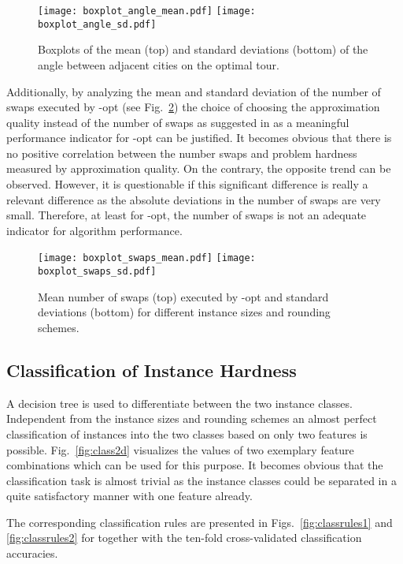 \documentclass{article}
\begin{document}
\begin{figure}
  \centering
  \texttt{[image: boxplot\_angle\_mean.pdf]}
  \texttt{[image: boxplot\_angle\_sd.pdf]}
  \caption{Boxplots of the mean (top) and standard deviations (bottom)
    of the angle between adjacent cities on the optimal tour.}
  \label{fig:anglestour}
\end{figure}

Additionally, by analyzing the mean and standard deviation of the
number of swaps executed by -opt (see Fig.~\ref{fig:swaps}) the
choice of choosing the approximation quality instead of the number of
swaps as suggested in \cite{SMHL10} as a meaningful performance
indicator for -opt can be justified. It becomes obvious that there
is no positive correlation between the number swaps and problem
hardness measured by approximation quality. On the contrary, the
opposite trend can be observed. However, it is questionable if this
significant difference is really a relevant difference as the absolute
deviations in the number of swaps are very small. Therefore, at least
for -opt, the number of swaps is not an adequate indicator for
algorithm performance.

\begin{figure}
  \centering
  \texttt{[image: boxplot\_swaps\_mean.pdf]}
  \texttt{[image: boxplot\_swaps\_sd.pdf]}
  \caption{Mean number of swaps (top) executed by -opt and standard
    deviations (bottom) for different instance sizes and rounding
    schemes.}\label{fig:swaps}
\end{figure}

\subsection{Classification of Instance Hardness}
\label{sec:class}

A decision tree \cite{Breiman1984} is used to differentiate between
the two instance classes. Independent from the instance sizes and
rounding schemes an almost perfect classification of instances into
the two classes based on only two features is
possible. Fig.~\ref{fig:class2d} visualizes the values of two
exemplary feature combinations which can be used for this purpose. It
becomes obvious that the classification task is almost trivial as the
instance classes could be separated in a quite satisfactory manner
with one feature already.

The corresponding classification rules are presented in
Figs.~\ref{fig:classrules1} and \ref{fig:classrules2} for  together with the ten-fold cross-validated classification accuracies.
\end{document}
